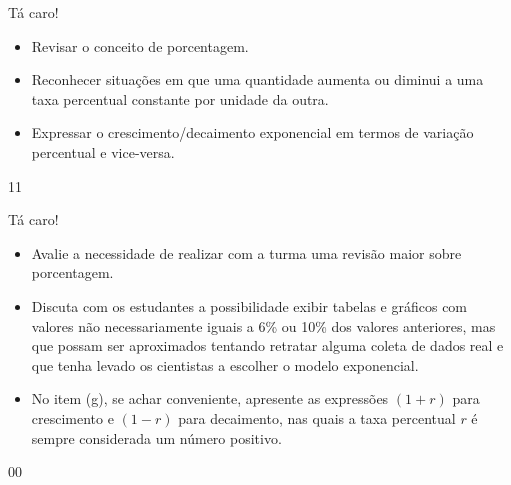 \begin{objectives}{Tá caro!}
{
	\begin{itemize}
	\item Revisar o conceito de porcentagem.

	\end{itemize}

	\begin{itemize}
	\item Reconhecer situações em que uma quantidade aumenta ou diminui a uma taxa percentual constante por unidade da outra.
	\item Expressar o crescimento/decaimento exponencial em termos de variação percentual e vice-versa.
	\end{itemize}
	}{1}{1}
\end{objectives}
\begin{sugestions}{Tá caro!}
{
	\begin{itemize}
	\item Avalie a necessidade de realizar com a turma uma revisão maior sobre porcentagem.
	\end{itemize}


	\begin{itemize}
	\item Discuta com os estudantes a possibilidade exibir tabelas e gráficos com valores não necessariamente iguais a 6\% ou 10\% dos valores anteriores, mas que possam ser aproximados tentando retratar alguma coleta de dados real e que tenha levado os cientistas a escolher o modelo exponencial.
	\item No item (g), se achar conveniente, apresente as expressões $(1+r)$ para crescimento e $(1-r)$ para decaimento, nas quais a taxa percentual $r$ é sempre considerada um número positivo.
	\end{itemize}
}{0}{0}
\end{sugestions}
